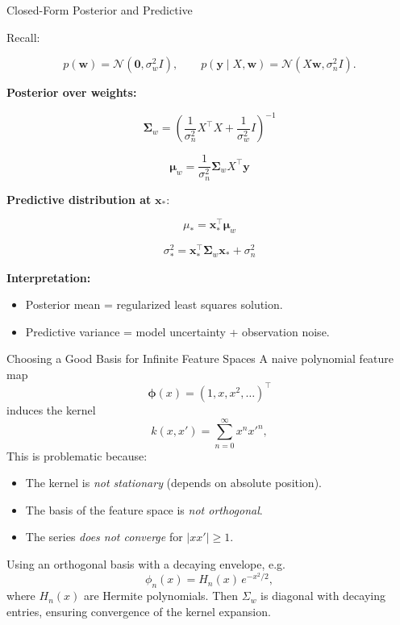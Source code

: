 \documentclass[9pt]{beamer}
\begin{document}
\begin{frame}{Closed-Form Posterior and Predictive}

Recall:

\[
p(\mathbf{w}) = \mathcal{N}(\mathbf{0}, \sigma_w^2 I),
\qquad
p(\mathbf{y}\mid X,\mathbf{w}) = \mathcal{N}(X\mathbf{w}, \sigma_n^2 I).
\]

\textbf{Posterior over weights:}

\[
\boldsymbol{\Sigma}_w
=
\left(
\frac{1}{\sigma_n^2} X^\top X
+
\frac{1}{\sigma_w^2} I
\right)^{-1}
\]

\[
\boldsymbol{\mu}_w
=
\frac{1}{\sigma_n^2}
\boldsymbol{\Sigma}_w
X^\top \mathbf{y}
\]

\vspace{0.3cm}

\textbf{Predictive distribution at } $\mathbf{x}_*$:

\[
\mu_*
=
\mathbf{x}_*^\top \boldsymbol{\mu}_w
\]

\[
\sigma_*^2
=
\mathbf{x}_*^\top \boldsymbol{\Sigma}_w \mathbf{x}_*
+
\sigma_n^2
\]

\textbf{Interpretation:}
\begin{itemize}
\item Posterior mean = regularized least squares solution.
\item Predictive variance = model uncertainty + observation noise.
\end{itemize}

\end{frame}


\begin{frame}{Choosing a Good Basis for Infinite Feature Spaces}
	A naive polynomial feature map
	\[
	\boldsymbol{\phi}(x) = (1, x, x^2, \ldots)^\top
	\]
	induces the kernel
	\[
		k(x,x') = \sum_{n=0}^\infty x^n x'^n,
	\]
	This is problematic because:
	\begin{itemize}
		\item The kernel is \emph{not stationary} (depends on absolute position).
		\item The basis of the feature space is \emph{not orthogonal}.
		\item The series \emph{does not converge} for $|x x'| \geq 1$.
	\end{itemize}

	Using an orthogonal basis with a decaying envelope, e.g.
	\[
		\phi_n(x) = H_n(x)\,e^{-x^2/2}, 
	\]
	where $H_n(x)$ are Hermite polynomials.
	Then $\Sigma_w$ is diagonal with decaying entries, ensuring convergence of the kernel expansion.
\end{frame}
\end{document}
